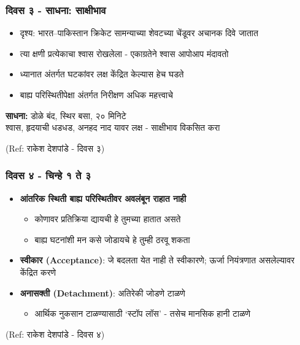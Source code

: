 \begin{frame}[fragile]\frametitle{दिवस ३ - साधना: साक्षीभाव}

	\begin{itemize}
	\item दृश्य: भारत--पाकिस्तान क्रिकेट सामन्याच्या शेवटच्या चेंडूवर अचानक दिवे जातात
	\item त्या क्षणी प्रत्येकाचा श्वास रोखलेला - एकाग्रतेने श्वास आपोआप मंदावतो
	\item ध्यानात अंतर्गत घटकांवर लक्ष केंद्रित केल्यास हेच घडते
	\item बाह्य परिस्थितीपेक्षा अंतर्गत निरीक्षण अधिक महत्त्वाचे
	\end{itemize}

	\vspace{2mm}
	\textbf{साधना:} डोळे बंद, स्थिर बसा, २० मिनिटे \\
	श्वास, हृदयाची धडधड, अनहद नाद यावर लक्ष - साक्षीभाव विकसित करा

{\tiny (Ref: राकेश देशपांडे - दिवस ३)}

\end{frame}


\begin{frame}[fragile]\frametitle{दिवस ४ - चिन्हे १ ते ३}

	\begin{itemize}
	\item \textbf{आंतरिक स्थिती बाह्य परिस्थितीवर अवलंबून राहात नाही}
		\begin{itemize}
		\item कोणावर प्रतिक्रिया द्यायची हे तुमच्या हातात असते
		\item बाह्य घटनांशी मन कसे जोडायचे हे तुम्ही ठरवू शकता
		\end{itemize}
	\item \textbf{स्वीकार (Acceptance)}: जे बदलता येत नाही ते स्वीकारणे; ऊर्जा नियंत्रणात असलेल्यावर केंद्रित करणे
	\item \textbf{अनासक्ती (Detachment)}: अतिरेकी जोडणे टाळणे
		\begin{itemize}
		\item आर्थिक नुकसान टाळण्यासाठी `स्टॉप लॉस' - तसेच मानसिक हानी टाळणे
		\end{itemize}
	\end{itemize}

{\tiny (Ref: राकेश देशपांडे - दिवस ४)}

\end{frame}


